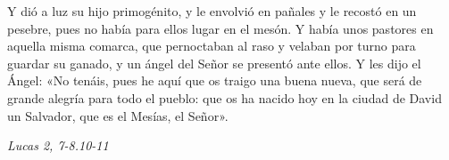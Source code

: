 \documentclass[../../devocionario.tex]{subfiles}
\begin{document}
    Y dió a luz su hijo primogénito, y le envolvió en pañales y le recostó en un pesebre, pues no había para ellos lugar en el mesón. 
    Y había unos pastores en aquella misma comarca, que pernoctaban al raso y velaban por turno para guardar su ganado, 
    y un ángel del  Señor se presentó ante ellos. Y les dijo el Ángel: «No tenáis, pues he aquí que os traigo una buena nueva, 
    que será de grande alegría para todo el pueblo: que os ha nacido hoy en la ciudad de David un Salvador, que es el Mesías, el Señor».

    \begin{flushright}
        \emph{Lucas 2, 7-8.10-11}
    \end{flushright}
\end{document}
